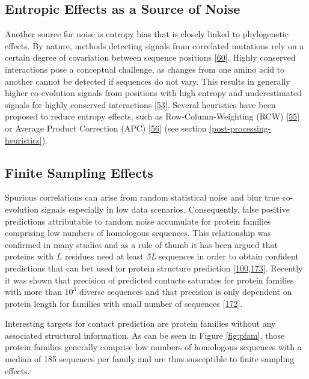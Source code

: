 \documentclass[11pt,a4paper,twoside]{book}
\theoremstyle{definition}
\theoremstyle{definition}
\theoremstyle{remark}
\begin{document}
\subsection{Entropic Effects as a Source of
Noise}\label{entropic-effects-as-a-source-of-noise}

Another source for noise is entropy bias that is closely linked to
phylogenetic effects. By nature, methods detecting signals from
correlated mutations rely on a certain degree of covariation between
sequence positions {[}\protect\hyperlink{ref-Burger2010}{60}{]}. Highly
conserved interactions pose a conceptual challenge, as changes from one
amino acid to another cannot be detected if sequences do not vary. This
results in generally higher co-evolution signals from positions with
high entropy and underestimated signals for highly conserved
interactions {[}\protect\hyperlink{ref-Fodor2004}{53}{]}. Several
heuristics have been proposed to reduce entropy effects, such as
Row-Column-Weighting (RCW)
{[}\protect\hyperlink{ref-Gouveia_Oliveira2007}{55}{]} or Average
Product Correction (APC) {[}\protect\hyperlink{ref-Dunn2008}{56}{]} (see
section \ref{post-processing-heuristics}).

\subsection{Finite Sampling Effects}\label{finite-sampling-effects}

Spurious correlations can arise from random statistical noise and blur
true co-evolution signals especially in low data scenarios.
Consequently, false positive predictions attributable to random noise
accumulate for protein families comprising low numbers of homologous
sequences. This relationship was confirmed in many studies and as a rule
of thumb it has been argued that proteins with \(L\) residues need at
least \emph{5L} sequences in order to obtain confident predictions that
can bet used for protein structure prediction
{[}\protect\hyperlink{ref-Kamisetty2013}{100},\protect\hyperlink{ref-Marks2012}{173}{]}.
Recently it was shown that precision of predicted contacts saturates for
protein families with more than \(10^3\) diverse sequences and that
precision is only dependent on protein length for families with small
number of sequences {[}\protect\hyperlink{ref-Anishchenko2017}{172}{]}.

Interesting targets for contact prediction are protein families without
any associated structural information. As can be seen in Figure
\ref{fig:pfam}, those protein families generally comprise low numbers of
homologous sequences with a median of 185 sequences per family and are
thus susceptible to finite sampling effects.
\end{document}
